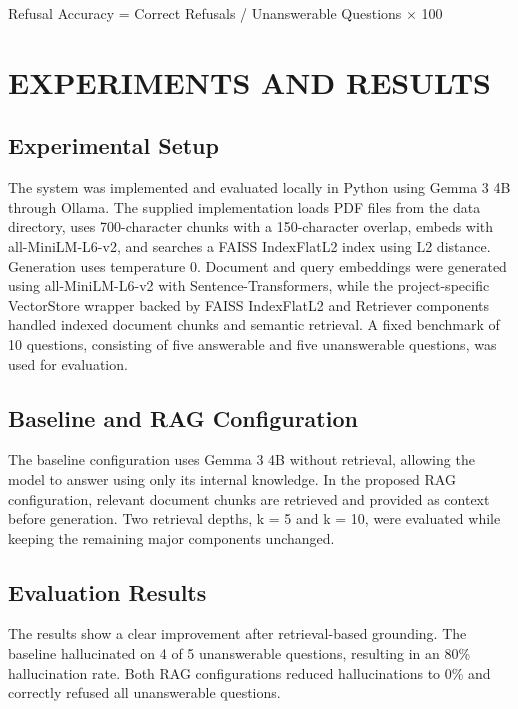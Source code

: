 \documentclass[conference]{IEEEtran}
\begin{document}
Refusal Accuracy = Correct Refusals / Unanswerable Questions × 100


\section{EXPERIMENTS AND RESULTS}
\subsection{Experimental Setup}
The system was implemented and evaluated locally in Python using Gemma 3 4B through Ollama. The supplied implementation loads PDF files from the data directory, uses 700-character chunks with a 150-character overlap, embeds with all-MiniLM-L6-v2, and searches a FAISS IndexFlatL2 index using L2 distance. Generation uses temperature 0. Document and query embeddings were generated using all-MiniLM-L6-v2 with Sentence-Transformers, while the project-specific VectorStore wrapper backed by FAISS IndexFlatL2 and Retriever components handled indexed document chunks and semantic retrieval. A fixed benchmark of 10 questions, consisting of five answerable and five unanswerable questions, was used for evaluation.
\subsection{Baseline and RAG Configuration}
The baseline configuration uses Gemma 3 4B without retrieval, allowing the model to answer using only its internal knowledge. In the proposed RAG configuration, relevant document chunks are retrieved and provided as context before generation. Two retrieval depths, k = 5 and k = 10, were evaluated while keeping the remaining major components unchanged.
\subsection{Evaluation Results}
The results show a clear improvement after retrieval-based grounding. The baseline hallucinated on 4 of 5 unanswerable questions, resulting in an 80\% hallucination rate. Both RAG configurations reduced hallucinations to 0\% and correctly refused all unanswerable questions.
\end{document}
